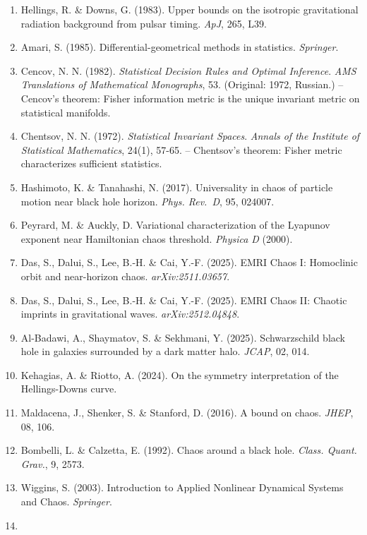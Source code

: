 \documentclass[
]{article}
\providecommand{\tightlist}{%
  \setlength{\itemsep}{0pt}\setlength{\parskip}{0pt}}
\begin{document}
\begin{enumerate}
\def\labelenumi{\arabic{enumi}.}
\tightlist
\item
  Hellings, R. \& Downs, G. (1983). Upper bounds on the isotropic
  gravitational radiation background from pulsar timing. \emph{ApJ},
  265, L39.
\item
  Amari, S. (1985). Differential-geometrical methods in statistics.
  \emph{Springer}.
\item\label{cencov}
  Cencov, N. N. (1982). \emph{Statistical Decision Rules and Optimal Inference}.
  \emph{AMS Translations of Mathematical Monographs}, 53. (Original: 1972, Russian.)
  -- Cencov's theorem: Fisher information metric is the unique invariant metric on statistical manifolds.
\item\label{chentsov}
  Chentsov, N. N. (1972). \emph{Statistical Invariant Spaces}.
  \emph{Annals of the Institute of Statistical Mathematics}, 24(1), 57-65.
  -- Chentsov's theorem: Fisher metric characterizes sufficient statistics.
\item
  Hashimoto, K. \& Tanahashi, N. (2017). Universality in chaos of
  particle motion near black hole horizon. \emph{Phys. Rev.~D}, 95,
  024007.
\item
  Peyrard, M. \& Auckly, D. Variational characterization of the Lyapunov
  exponent near Hamiltonian chaos threshold. \emph{Physica D} (2000).
\item
  Das, S., Dalui, S., Lee, B.-H. \& Cai, Y.-F. (2025). EMRI Chaos I:
  Homoclinic orbit and near-horizon chaos. \emph{arXiv:2511.03657}.
\item
  Das, S., Dalui, S., Lee, B.-H. \& Cai, Y.-F. (2025). EMRI Chaos II:
  Chaotic imprints in gravitational waves. \emph{arXiv:2512.04848}.
\item
  Al-Badawi, A., Shaymatov, S. \& Sekhmani, Y. (2025). Schwarzschild
  black hole in galaxies surrounded by a dark matter halo. \emph{JCAP},
  02, 014.
\item
  Kehagias, A. \& Riotto, A. (2024). On the symmetry interpretation of
  the Hellings-Downs curve.
\item\label{mss}
  Maldacena, J., Shenker, S. \& Stanford, D. (2016). A bound on chaos.
  \emph{JHEP}, 08, 106.
\item
  Bombelli, L. \& Calzetta, E. (1992). Chaos around a black hole.
  \emph{Class. Quant. Grav.}, 9, 2573.
\item
  Wiggins, S. (2003). Introduction to Applied Nonlinear Dynamical
  Systems and Chaos. \emph{Springer}.
\item

\end{enumerate}
\end{document}
